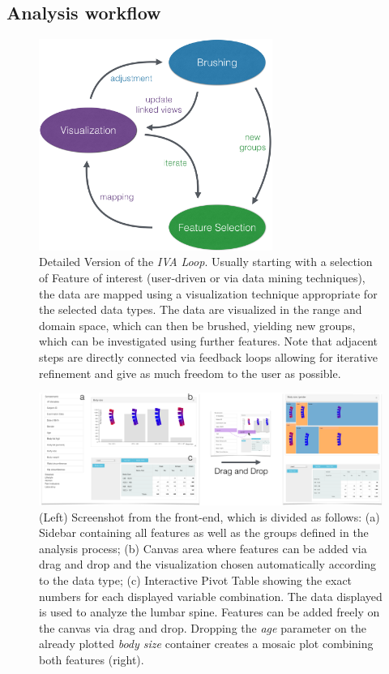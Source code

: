 \documentclass[journal]{style/vgtc} 			          %
\begin{document}
\subsection{Analysis workflow}
\begin{figure}[htb]
 \centering
 \includegraphics[width=3.0in]{figures/InteractionLoop}
 \caption{Detailed Version of the \emph{IVA Loop}. Usually starting with a selection of Feature of interest (user-driven or via data mining techniques), the data are mapped using a visualization technique appropriate for the selected data types. The data are visualized in the range and domain space, which can then be brushed, yielding new groups, which can be investigated using further features. Note that adjacent steps are directly connected via feedback loops allowing for iterative refinement and give as much freedom to the user as possible.}
 \label{fig:InteractionLoop}
\end{figure}
\begin{figure}[htb]
 \centering
 \includegraphics[width=1\textwidth, resolution=300]{figures/visualization}
 \caption{(Left) Screenshot from the front-end, which is divided as follows: (a) Sidebar containing all features as well as the groups defined in the analysis process; (b) Canvas area where features can be added via drag and drop and the visualization chosen automatically according to the data type; (c) Interactive Pivot Table showing the exact numbers for each displayed variable combination. The data displayed is used to analyze the lumbar spine. Features can be added freely on the canvas via drag and drop. Dropping the \emph{age} parameter on the already plotted \emph{body size} container creates a mosaic plot combining both features (right).
 }
 \label{fig:visualization}
\end{figure}
\end{document}
